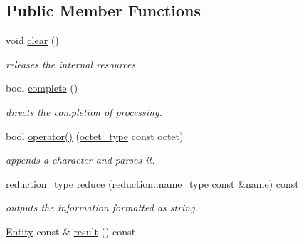 \subsection*{Public Member Functions}
\begin{DoxyCompactItemize}
\item 
\hypertarget{classhryky_1_1ip_1_1v6_1_1_writer_a94f661dd9a74173a17b3841e5aad30cc}{void \hyperlink{classhryky_1_1ip_1_1v6_1_1_writer_a94f661dd9a74173a17b3841e5aad30cc}{clear} ()}\label{classhryky_1_1ip_1_1v6_1_1_writer_a94f661dd9a74173a17b3841e5aad30cc}

\begin{DoxyCompactList}\small\item\em releases the internal resources. \end{DoxyCompactList}\item 
\hypertarget{classhryky_1_1ip_1_1v6_1_1_writer_a4cff3d977b8aab4ed23589dc2cc33692}{bool \hyperlink{classhryky_1_1ip_1_1v6_1_1_writer_a4cff3d977b8aab4ed23589dc2cc33692}{complete} ()}\label{classhryky_1_1ip_1_1v6_1_1_writer_a4cff3d977b8aab4ed23589dc2cc33692}

\begin{DoxyCompactList}\small\item\em directs the completion of processing. \end{DoxyCompactList}\item 
\hypertarget{classhryky_1_1ip_1_1v6_1_1_writer_a570722cfd9dbdef97744022167dcca8f}{bool \hyperlink{classhryky_1_1ip_1_1v6_1_1_writer_a570722cfd9dbdef97744022167dcca8f}{operator()} (\hyperlink{namespacehryky_a488cba8b666be33ccca70e819684e3c8}{octet\-\_\-type} const octet)}\label{classhryky_1_1ip_1_1v6_1_1_writer_a570722cfd9dbdef97744022167dcca8f}

\begin{DoxyCompactList}\small\item\em appends a character and parses it. \end{DoxyCompactList}\item 
\hypertarget{classhryky_1_1ip_1_1v6_1_1_writer_a8e20bbb8e54f0d4b5ab4b066695a2632}{\hyperlink{namespacehryky_a343a9a4c36a586be5c2693156200eadc}{reduction\-\_\-type} \hyperlink{classhryky_1_1ip_1_1v6_1_1_writer_a8e20bbb8e54f0d4b5ab4b066695a2632}{reduce} (\hyperlink{namespacehryky_1_1reduction_ac686c30a4c8d196bbd0f05629a6b921f}{reduction\-::name\-\_\-type} const \&name) const }\label{classhryky_1_1ip_1_1v6_1_1_writer_a8e20bbb8e54f0d4b5ab4b066695a2632}

\begin{DoxyCompactList}\small\item\em outputs the information formatted as string. \end{DoxyCompactList}\item 
\hypertarget{classhryky_1_1ip_1_1v6_1_1_writer_a1a7a3c72e47c0f6bbf8a219951b2d8ac}{\hyperlink{classhryky_1_1ip_1_1v6_1_1_entity}{Entity} const \& \hyperlink{classhryky_1_1ip_1_1v6_1_1_writer_a1a7a3c72e47c0f6bbf8a219951b2d8ac}{result} () const }\label{classhryky_1_1ip_1_1v6_1_1_writer_a1a7a3c72e47c0f6bbf8a219951b2d8ac}


\end{DoxyCompactItemize}
